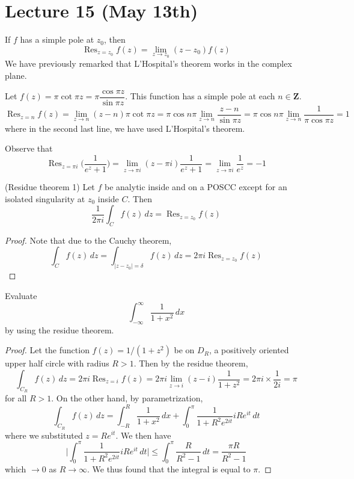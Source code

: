 \section{Lecture 15 (May 13th)}
\begin{rmk}
If $f$ has a simple pole at $z_0$, then 
\[\mathop{\mathrm{Res}}_{z=z_0}f(z)=\lim _{z\rightarrow z_0}(z-z_0)f(z)\]
We have previously remarked that L'Hospital's theorem works in the complex plane.
\end{rmk}
\vspace{2ex}
\begin{ex}
Let $f(z)=\pi \cot \pi z=\pi \dfrac{\cos \pi z}{\sin \pi z}$. This function has a simple pole at each $n\in {\bm Z}$.
\[\mathop{\mathrm{Res}}_{z=n}f(z)=\lim _{z\rightarrow n}(z-n)\pi \cot\pi z=\pi \cos n\pi \lim _{z\rightarrow n}\dfrac{z-n}{\sin \pi z}=\pi \cos n\pi \lim _{z\rightarrow n}\dfrac{1}{\pi \cos \pi z}=1\]
where in the second last line, we have used L'Hospital's theorem.
\end{ex}
\vspace{2ex}
\begin{ex}
Observe that
\[\mathop{\mathrm{Res}}_{z=\pi i}\Big(\dfrac{1}{e^{z}+1}\Big)=\lim _{z\rightarrow \pi i}(z-\pi i)\dfrac{1}{e^{z}+1}=\lim _{z\rightarrow \pi i}\dfrac{1}{e^{z}}=-1\]
\end{ex}
\vspace{2ex}
\begin{thm}
(Residue theorem 1) Let $f$ be analytic inside and on a POSCC except for an isolated singularity at $z_0$ inside $C$. Then 
\[\dfrac{1}{2\pi i}\int _{C}f(z)\,dz=\mathop{\mathrm{Res}}_{z=z_0}f(z)\]
\end{thm}
\vspace{2ex}
\begin{proof}
Note that due to the Cauchy theorem,
\[\int _{C}f(z)\,dz=\int _{|z-z_0|=\delta }f(z)\,dz=2\pi i\mathop{\mathrm{Res}}_{z=z_0}f(z)\]
\end{proof}
\vspace{2ex}
\begin{ex}
Evaluate 
\[\int _{-\infty }^{\infty }\dfrac{1}{1+x^2}\,dx\]
by using the residue theorem.
\end{ex}
\vspace{2ex}
\begin{proof}
Let the function $f(z)=1/(1+z^2)$ be on $D_{R}$, a positively oriented upper half circle with radius $R>1$. Then by the residue theorem, 
\[\int _{C_{R}}f(z)\,dz=2\pi i\mathop{\mathrm{Res}}_{z=i}f(z)=2\pi i\lim _{z\rightarrow i}(z-i)\dfrac{1}{1+z^2}=2\pi i \times \dfrac{1}{2i}=\pi \]
for all $R>1$. On the other hand, by parametrization,
\[\int _{C_{R}}f(z)\,dz=\int ^{R}_{-R}\dfrac{1}{1+x^2}\,dx+\int ^{\pi }_{0}\dfrac{1}{1+R^2e^{2it}}iRe^{it}\,dt\]
where we substituted $z=Re^{it}$. We then have
\[\Big|\int ^{\pi }_{0}\dfrac{1}{1+R^2e^{2it}}iRe^{it}\,dt\Big|\leq \int ^{\pi }_{0}\dfrac{R}{R^2-1}\,dt=\dfrac{\pi R}{R^2-1}\]
which $\rightarrow 0$ as $R\rightarrow \infty $. We thus found that the integral is equal to $\pi $.
\end{proof}
